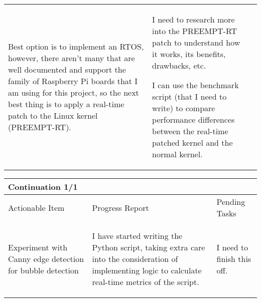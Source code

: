 \begin{table}[!h]
\begin{tabularx}{\textwidth}{|X|X|X|}
\begin{myitemize}
            \item Best option is to implement an RTOS, however, there aren't many that are well documented and support the family of Raspberry Pi boards that I am using for this project, so the next best thing is to apply a real-time patch to the Linux kernel (PREEMPT-RT).
        \end{myitemize} &
        \begin{myitemize}
            \item I need to research more into the PREEMPT-RT patch to understand how it works, its benefits, drawbacks, etc.
            \item I can use the benchmark script (that I need to write) to compare performance differences between the real-time patched kernel and the normal kernel.
        \end{myitemize} \\
    \end{tabularx}
\end{table}

\pagebreak

\begin{table}[!h]
    \centering
    \begin{tabularx}{\textwidth}{|X|X|X|}
        \hline
        Continuation 1/1 \\
        \hline
        \hline
        Actionable Item & Progress Report & Pending Tasks \\
        \hline
        \hline
        Experiment with Canny edge detection for bubble detection & 
        \begin{myitemize}
            \item I have started writing the Python script, taking extra care into the consideration of implementing logic to calculate real-time metrics of the script.
        \end{myitemize} &
        \begin{myitemize}
            \item I need to finish this off.
        \end{myitemize} \\
    \end{tabularx}
\end{table}

